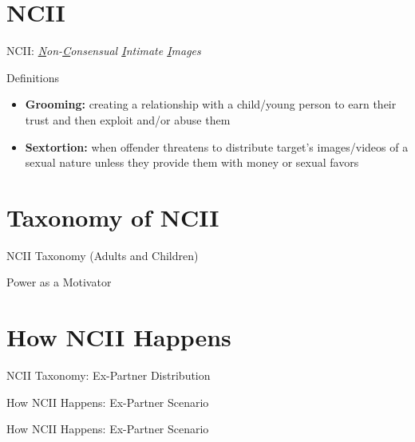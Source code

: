\documentclass[nobackground,dvipsnames,table,aspectratio=169]{beamer}
\begin{document}
\section{NCII}

\begin{frame}{NCII:}
    \centering
    \LARGE
    \textit{\underline{N}on-\underline{C}onsensual \underline{I}ntimate \underline{I}mages}
\end{frame}

\begin{frame}{Definitions}
    \large
    \begin{itemize}
        \item \textbf{Grooming:} creating a relationship with a child/young person  to earn their trust and then exploit and/or abuse them
        \item \textbf{Sextortion:} when offender threatens to distribute target’s  images/videos of a sexual nature unless they provide them with money or sexual favors
    \end{itemize}
\end{frame}

\section{Taxonomy of NCII}

\begin{frame}{NCII Taxonomy (Adults and Children)}
\end{frame}

\begin{frame}{Power as a Motivator}
\end{frame}

\section{How NCII Happens}

\begin{frame}{NCII Taxonomy: Ex-Partner Distribution}
\end{frame}

\begin{frame}{How NCII Happens: Ex-Partner Scenario}
\end{frame}

\begin{frame}{How NCII Happens: Ex-Partner Scenario}
\end{frame}
\end{document}
